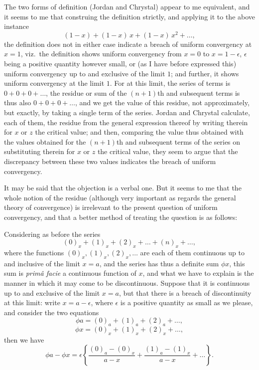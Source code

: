 \documentclass[11pt]{article}
\begin{document}
The two forms of definition (Jordan and Chrystal) appear to me equivalent, and it seems to me that construing the definition strictly, and applying it to the above instance
\[
(1 - x) + (1 - x)\, x + (1 - x)\, x^2 + \ldots,
\]
the definition does not in either case indicate a breach of uniform convergency at $x = 1$, viz.\ the definition shows uniform convergency from $x = 0$ to $x = 1 - \epsilon$, $\epsilon$ being a positive quantity however small, or (as I have before expressed this) uniform convergency up to and exclusive of the limit $1$; and further, it shows uniform convergency at the limit $1$.  For at this limit, the series of terms is $0 + 0 + 0 + \ldots$, the residue or sum of the $(n+1)$th and subsequent terms is thus also $0 + 0 + 0 + \ldots$, and we get the value of this residue, not approximately, but exactly, by taking a single term of the series.  Jordan and Chrystal calculate, each of them, the residue from the general expression thereof by writing therein for $x$ or $z$ the critical value; and then, comparing the value thus obtained with the values obtained for the $(n+1)$th and subsequent terms of the series on substituting therein for $x$ or $z$ the critical value, they seem to argue that the discrepancy between these two values indicates the breach of uniform convergency.

It may be said that the objection is a verbal one. But it seems to me that the whole notion of the residue (although very important as regards the general theory of convergence) is irrelevant to the present question of uniform convergency, and that a better method of treating the question is as follows:

Considering as before the series
\[
(0)_x + (1)_x + (2)_x + \ldots + (n)_x + \ldots,
\]
where the functions $(0)_x, (1)_x, (2)_x, \ldots$ are each of them continuous up to and inclusive of the limit $x = a$, and the series has thus a definite sum $\phi x$, this sum is \textit{prim\^a facie} a continuous function of $x$, and what we have to explain is the manner in which it may come to be discontinuous.  Suppose that it is continuous up to and exclusive of the limit $x = a$, but that there is a breach of discontinuity at this limit: write $x = a - \epsilon$, where $\epsilon$ is a positive quantity as small as we please, and consider the two equations
\[
\phi a = (0)_a + (1)_a + (2)_a + \ldots,
\]
\[
\phi x = (0)_x + (1)_x + (2)_x + \ldots,
\]
then we have
\[
\phi a - \phi x = \epsilon\!\left\{\frac{(0)_a - (0)_x}{a - x} + \frac{(1)_a - (1)_x}{a - x} + \ldots\right\}.
\]
\end{document}
